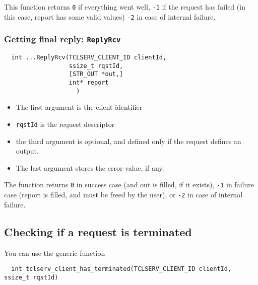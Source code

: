 This function returns \texttt{0}  if everything went well,  \texttt{-1} if the
request has failed (in this case, report has some valid values) \texttt{-2} in
case of internal failure.

\subsubsection{Getting final reply: \texttt{ReplyRcv}}

\begin{center}\begin{cartouche}\small\begin{verbatim}
  int ...ReplyRcv(TCLSERV_CLIENT_ID clientId,
                  ssize_t rqstId, 
                  [STR_OUT *out,]
                  int* report
					)
\end{verbatim}\end{cartouche}\end{center}


\begin{itemize}
\item The first argument is the client identifier

\item \texttt{rqstId} is the request descriptor

\item the third argument is optional, and defined only if the request defines
an output.

\item The last argument stores the error value, if any.
\end{itemize}

The function returns \texttt{0} in success case (and out is filled, if it
exists), \texttt{-1} in failure case (report is filled, and must be freed by
the user), or \texttt{-2} in case of internal failure.

\subsection{Checking if a request is terminated}

You can use the generic function 

\begin{center}\begin{cartouche}\small\begin{verbatim}
  int tclserv_client_has_terminated(TCLSERV_CLIENT_ID clientId, ssize_t rqstId)
\end{verbatim}\end{cartouche}\end{center}

